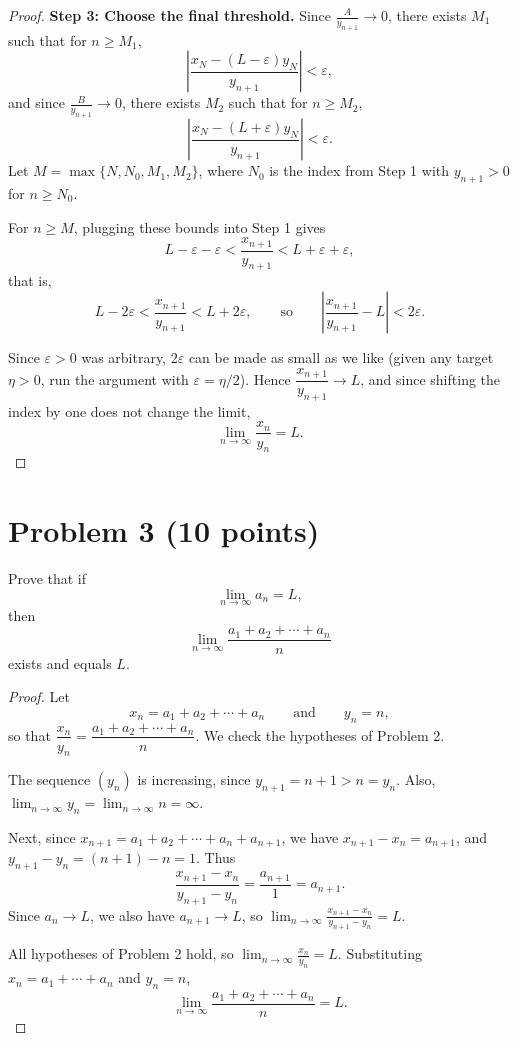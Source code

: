 \documentclass[11pt]{article}
\begin{document}
\begin{proof}
\textbf{Step 3: Choose the final threshold.}
Since $\frac{A}{y_{n+1}}\to0$, there exists $M_1$ such that for $n\ge M_1$,
\[
  \left|\frac{x_N-(L-\varepsilon)y_N}{y_{n+1}}\right| < \varepsilon ,
\]
and since $\frac{B}{y_{n+1}}\to0$, there exists $M_2$ such that for $n\ge M_2$,
\[
  \left|\frac{x_N-(L+\varepsilon)y_N}{y_{n+1}}\right| < \varepsilon .
\]
Let $M=\max\{N, N_0, M_1, M_2\}$, where $N_0$ is the index from Step 1 with
$y_{n+1}>0$ for $n\ge N_0$.

For $n\ge M$, plugging these bounds into Step 1 gives
\[
  L-\varepsilon-\varepsilon < \frac{x_{n+1}}{y_{n+1}} < L+\varepsilon+\varepsilon,
\]
that is,
\[
  L-2\varepsilon < \frac{x_{n+1}}{y_{n+1}} < L+2\varepsilon,
  \qquad\text{so}\qquad
  \left|\frac{x_{n+1}}{y_{n+1}}-L\right| < 2\varepsilon .
\]

Since $\varepsilon>0$ was arbitrary, $2\varepsilon$ can be made as small as we
like (given any target $\eta>0$, run the argument with $\varepsilon=\eta/2$).
Hence $\dfrac{x_{n+1}}{y_{n+1}}\to L$, and since shifting the index by one does
not change the limit,
\[
  \lim_{n\to\infty}\frac{x_n}{y_n} = L .
\]

\end{proof}

\section*{Problem 3 (10 points)}
Prove that if
\[
  \lim_{n\to\infty}a_n = L,
\]
then
\[
  \lim_{n\to\infty}\frac{a_1+a_2+\cdots+a_n}{n}
\]
exists and equals $L$.

\begin{proof}

Let
\[
  x_n = a_1+a_2+\cdots+a_n \qquad\text{and}\qquad y_n = n,
\]
so that $\dfrac{x_n}{y_n} = \dfrac{a_1+a_2+\cdots+a_n}{n}$. We check the
hypotheses of Problem 2.

The sequence $(y_n)$ is increasing, since $y_{n+1}=n+1>n=y_n$. Also,
$\displaystyle\lim_{n\to\infty}y_n=\lim_{n\to\infty}n=\infty$.

Next, since $x_{n+1}=a_1+a_2+\cdots+a_n+a_{n+1}$, we have
$x_{n+1}-x_n=a_{n+1}$, and $y_{n+1}-y_n=(n+1)-n=1$. Thus
\[
  \frac{x_{n+1}-x_n}{y_{n+1}-y_n} = \frac{a_{n+1}}{1} = a_{n+1}.
\]
Since $a_n\to L$, we also have $a_{n+1}\to L$, so
$\displaystyle\lim_{n\to\infty}\frac{x_{n+1}-x_n}{y_{n+1}-y_n}=L$.

All hypotheses of Problem 2 hold, so $\displaystyle\lim_{n\to\infty}\frac{x_n}{y_n}=L$.
Substituting $x_n=a_1+\cdots+a_n$ and $y_n=n$,
\[
  \lim_{n\to\infty}\frac{a_1+a_2+\cdots+a_n}{n} = L .
\]

\end{proof}
\end{document}
